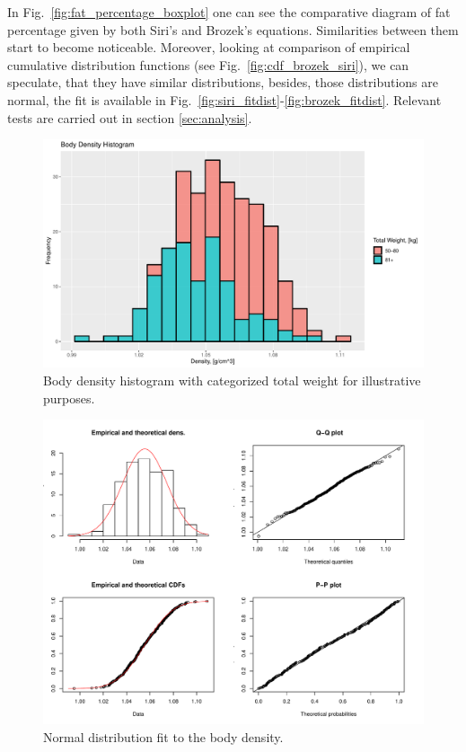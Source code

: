 \documentclass[11pt,american,american]{article}
\begin{document}
\medskip

In Fig.~\ref{fig:fat_percentage_boxplot} one can see the comparative diagram of fat percentage given by both Siri's and Brozek's equations. Similarities between them start to become noticeable. Moreover, looking at comparison of empirical cumulative distribution functions (see Fig.~\ref{fig:cdf_brozek_siri}), we can speculate, that they have similar distributions, besides, those distributions are normal, the fit is available in Fig.~\ref{fig:siri_fitdist}-\ref{fig:brozek_fitdist}. Relevant tests are carried out in section \ref{sec:analysis}.

\newpage

\vspace*{\fill}
\begin{figure}[H]
	\centering
	\includegraphics[width=0.75\linewidth]{Images/FIGURES/body_density_histogram}
	\caption{Body density histogram with categorized total weight for illustrative purposes.}
	\label{fig:body_density_histogram}
\end{figure}

\begin{figure}[H]
	\centering
	\includegraphics[width=0.8\linewidth]{Images/FIGURES/density_fitdist}
	\caption{Normal distribution fit to the body density.}
	\label{fig:density_fitdist}
\end{figure}
\vspace*{\fill}
\end{document}
